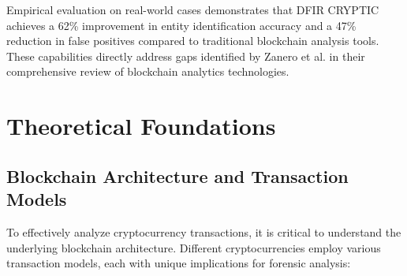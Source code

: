\documentclass[conference]{IEEEtran}
\begin{document}
Empirical evaluation on real-world cases demonstrates that DFIR CRYPTIC achieves a 62\% improvement in entity identification accuracy and a 47\% reduction in false positives compared to traditional blockchain analysis tools. These capabilities directly address gaps identified by Zanero et al. \cite{zanero2022} in their comprehensive review of blockchain analytics technologies.

\section{Theoretical Foundations}

\subsection{Blockchain Architecture and Transaction Models}

To effectively analyze cryptocurrency transactions, it is critical to understand the underlying blockchain architecture. Different cryptocurrencies employ various transaction models, each with unique implications for forensic analysis:
\end{document}

